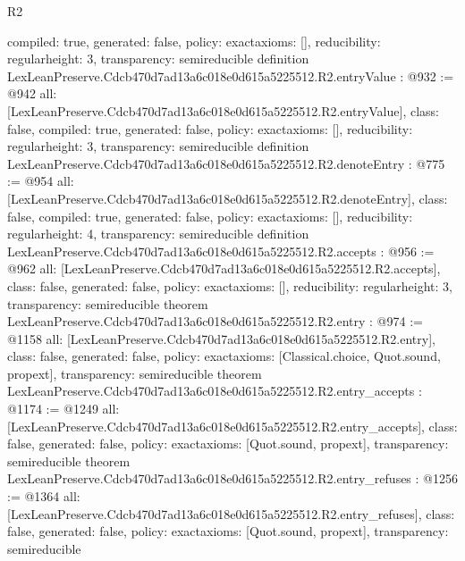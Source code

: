 \begin{lexlean}{R2}
\begin{coremodule}
{  compiled: true,
  generated: false,
  policy: exact{axioms: []},
  reducibility: regular{height: 3},
  transparency: semireducible
}
definition LexLeanPreserve.Cdcb470d7ad13a6c018e0d615a5225512.R2.entryValue : @932 := @942 {
  all: [LexLeanPreserve.Cdcb470d7ad13a6c018e0d615a5225512.R2.entryValue],
  class: false,
  compiled: true,
  generated: false,
  policy: exact{axioms: []},
  reducibility: regular{height: 3},
  transparency: semireducible
}
definition LexLeanPreserve.Cdcb470d7ad13a6c018e0d615a5225512.R2.denoteEntry : @775 := @954 {
  all: [LexLeanPreserve.Cdcb470d7ad13a6c018e0d615a5225512.R2.denoteEntry],
  class: false,
  compiled: true,
  generated: false,
  policy: exact{axioms: []},
  reducibility: regular{height: 4},
  transparency: semireducible
}
definition LexLeanPreserve.Cdcb470d7ad13a6c018e0d615a5225512.R2.accepts : @956 := @962 {
  all: [LexLeanPreserve.Cdcb470d7ad13a6c018e0d615a5225512.R2.accepts],
  class: false,
  generated: false,
  policy: exact{axioms: []},
  reducibility: regular{height: 3},
  transparency: semireducible
}
theorem LexLeanPreserve.Cdcb470d7ad13a6c018e0d615a5225512.R2.entry : @974 := @1158 {
  all: [LexLeanPreserve.Cdcb470d7ad13a6c018e0d615a5225512.R2.entry],
  class: false,
  generated: false,
  policy: exact{axioms: [Classical.choice, Quot.sound, propext]},
  transparency: semireducible
}
theorem LexLeanPreserve.Cdcb470d7ad13a6c018e0d615a5225512.R2.entry_accepts : @1174 := @1249 {
  all: [LexLeanPreserve.Cdcb470d7ad13a6c018e0d615a5225512.R2.entry_accepts],
  class: false,
  generated: false,
  policy: exact{axioms: [Quot.sound, propext]},
  transparency: semireducible
}
theorem LexLeanPreserve.Cdcb470d7ad13a6c018e0d615a5225512.R2.entry_refuses : @1256 := @1364 {
  all: [LexLeanPreserve.Cdcb470d7ad13a6c018e0d615a5225512.R2.entry_refuses],
  class: false,
  generated: false,
  policy: exact{axioms: [Quot.sound, propext]},
  transparency: semireducible
}


\end{coremodule}
\end{lexlean}
